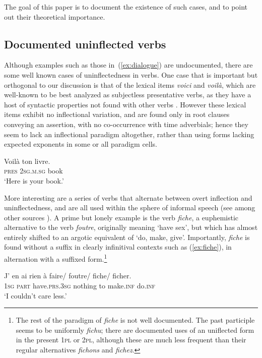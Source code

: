 \documentclass[output=paper,colorlinks,citecolor=brown]{langscibook}
\begin{document}
The goal of this paper is to document the existence of such cases, and to point out their theoretical importance.



\subsection{Documented uninflected verbs}

Although examples such as those in~(\ref{ex:dialogue}) are undocumented, there are some well known cases of uninflectedness in  verbs. One case that is important but orthogonal to our discussion is that of the lexical items \emph{voici} and \emph{voilà}, which are well-known to be best analyzed as subjectless presentative verbs, as they have a host of syntactic properties not found with other verbs \citep{morin1985,bouchard1988}. However these lexical items exhibit no inflectional variation, and are found only in root clauses conveying an assertion, with no co-occurrence with time adverbials; hence they seem to lack an inflectional paradigm altogether, rather than using forms lacking expected exponents in some or all paradigm cells.

\begin{exe}
	\ex\label{ex:voila}\gll Voilà ton livre.\\
	\textsc{pres} \textsc{2sg.m.sg} book\\
	\trans ‘Here is your book.’
\end{exe}

More interesting are a series of verbs that alternate between overt inflection and uninflectedness, and are all used within the sphere of informal speech (see among other sources  \citealt{antoine2000,cerquiglini2019,gadetwachs2016}). A prime but lonely example is the verb \emph{fiche},  a euphemistic alternative to the  verb \emph{foutre}, originally meaning ‘have sex’, but which has almost entirely shifted to an argotic equivalent of ‘do, make, give’. Importantly, \emph{fiche} is found without a suffix in clearly infinitival contexts such as (\ref{ex:fiche}), in alternation with a suffixed form.\footnote{The rest of the paradigm of \emph{fiche} is not well documented. The past participle seems to be uniformly \emph{fichu}; there are documented uses of an uniflected form in the present \textsc{1pl} or \textsc{2pl}, although these are much less frequent than their regular alternatives \emph{fichons} and \emph{fichez}.}  

\begin{exe}
	\ex\label{ex:fiche}\gll J' en ai rien à faire/ foutre/ fiche/ ficher.\\
	\textsc{1sg} \textsc{part} have.\textsc{prs.3sg} nothing to make.\textsc{inf} do.\textsc{inf} \\
	\trans ‘I couldn't care less.’
\end{exe}
\end{document}
